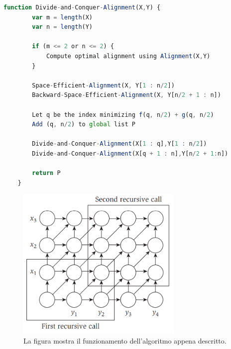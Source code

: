 \begin{lstlisting}[language=JavaScript]
    function Divide-and-Conquer-Alignment(X,Y) {
        var m = length(X)
        var n = length(Y)

        if (m <= 2 or n <= 2) {
            Compute optimal alignment using Alignment(X,Y)
        }

        Space-Efficient-Alignment(X, Y[1 : n/2])
        Backward-Space-Efficient-Alignment(X, Y[n/2 + 1 : n])

        Let q be the index minimizing f(q, n/2) + g(q, n/2)
        Add (q, n/2) to global list P

        Divide-and-Conquer-Alignment(X[1 : q],Y[1 : n/2])
        Divide-and-Conquer-Alignment(X[q + 1 : n],Y[n/2 + 1:n])

        return P
    }
\end{lstlisting}

\begin{figure}[H]
    \centering
    \includegraphics[width=8cm, keepaspectratio]{capitoli/dynamic_programming/imgs/seq_align_recurrence.png}
    \caption{La figura mostra il funzionamento dell'algoritmo appena descritto.}
\end{figure}
